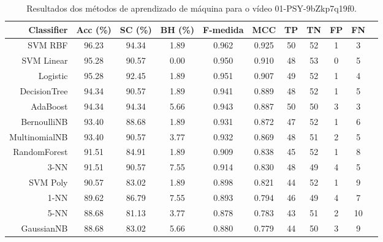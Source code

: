 \begin{table}[!htb]
\centering
\caption{Resultados dos métodos de aprendizado de máquina para o vídeo 01-PSY-9bZkp7q19f0.}
\label{tab:01-PSY-9bZkp7q19f0}
\begin{tabular}{r|c|c|c|c|c|c|c|c|c|c}
\hline\hline
Classifier & Acc (\%) & SC (\%) & BH (\%) & F-medida & MCC & TP & TN & FP & FN \\ \hline
SVM RBF & 96.23 & 94.34 & 1.89 & 0.962 & 0.925 & 50 & 52 & 1 & 3 \\ 
SVM Linear & 95.28 & 90.57 & 0.00 & 0.950 & 0.910 & 48 & 53 & 0 & 5 \\ 
Logistic & 95.28 & 92.45 & 1.89 & 0.951 & 0.907 & 49 & 52 & 1 & 4 \\ 
DecisionTree & 94.34 & 90.57 & 1.89 & 0.941 & 0.889 & 48 & 52 & 1 & 5 \\ 
AdaBoost & 94.34 & 94.34 & 5.66 & 0.943 & 0.887 & 50 & 50 & 3 & 3 \\ 
BernoulliNB & 93.40 & 88.68 & 1.89 & 0.931 & 0.872 & 47 & 52 & 1 & 6 \\ 
MultinomialNB & 93.40 & 90.57 & 3.77 & 0.932 & 0.869 & 48 & 51 & 2 & 5 \\ 
RandomForest & 91.51 & 84.91 & 1.89 & 0.909 & 0.838 & 45 & 52 & 1 & 8 \\ 
3-NN & 91.51 & 90.57 & 7.55 & 0.914 & 0.830 & 48 & 49 & 4 & 5 \\ 
SVM Poly & 90.57 & 83.02 & 1.89 & 0.898 & 0.821 & 44 & 52 & 1 & 9 \\ 
1-NN & 89.62 & 86.79 & 7.55 & 0.893 & 0.794 & 46 & 49 & 4 & 7 \\ 
5-NN & 88.68 & 81.13 & 3.77 & 0.878 & 0.783 & 43 & 51 & 2 & 10 \\ 
GaussianNB & 88.68 & 83.02 & 5.66 & 0.880 & 0.779 & 44 & 50 & 3 & 9 \\ 
\hline\hline
\end{tabular}
\end{table}
